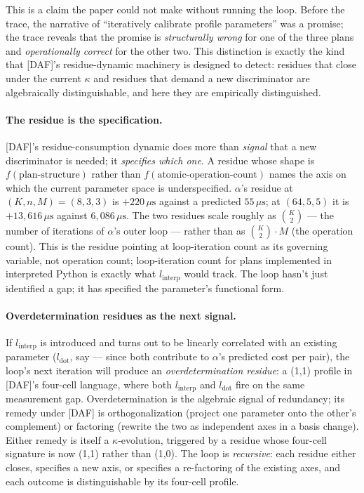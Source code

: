 This is a claim the paper could not make without
running the loop. Before the trace, the narrative of
``iteratively calibrate profile parameters'' was a
promise; the trace reveals that the promise is
\emph{structurally wrong} for one of the three plans
and \emph{operationally correct} for the other two. This
distinction is exactly the kind that [DAF]'s residue-dynamic
machinery is designed to detect: residues that close
under the current $\kappa$ and residues that demand a
new discriminator are algebraically distinguishable,
and here they are empirically distinguished.

\paragraph{The residue is the specification.}
[DAF]'s residue-consumption dynamic does more than
\emph{signal} that a new discriminator is needed; it
\emph{specifies which one}. A residue whose shape is
$f(\text{plan-structure})$ rather than
$f(\text{atomic-operation-count})$ names the axis on
which the current parameter space is underspecified.
$\alpha$'s residue at $(K, n, M) = (8,3,3)$ is
$+220\,\mu\mathrm{s}$ against a predicted
$55\,\mu\mathrm{s}$; at $(64,5,5)$ it is
$+13{,}616\,\mu\mathrm{s}$ against $6{,}086\,\mu\mathrm{s}$.
The two residues scale roughly as $\binom{K}{2}$
--- the number of iterations of $\alpha$'s outer loop ---
rather than as $\binom{K}{2} \cdot M$ (the operation count).
This is the residue pointing at loop-iteration count as its
governing variable, not operation count; loop-iteration
count for plans implemented in interpreted Python is
exactly what $l_{\mathrm{interp}}$ would track. The
loop hasn't just identified a gap; it has
specified the parameter's functional form.

\paragraph{Overdetermination residues as the next signal.}
If $l_{\mathrm{interp}}$ is introduced and turns out
to be linearly correlated with an existing parameter
($l_{\mathrm{dot}}$, say --- since both contribute to
$\alpha$'s predicted cost per pair), the loop's next
iteration will produce an \emph{overdetermination
residue}: a (1,1) profile in [DAF]'s four-cell
language, where both $l_{\mathrm{interp}}$ and
$l_{\mathrm{dot}}$ fire on the same measurement gap.
Overdetermination is the algebraic signal of
redundancy; its remedy under [DAF] is
orthogonalization (project one parameter onto the
other's complement) or factoring (rewrite the two
as independent axes in a basis change). Either
remedy is itself a $\kappa$-evolution, triggered by
a residue whose four-cell signature is now
(1,1) rather than (1,0). The loop is \emph{recursive}:
each residue either closes, specifies a new axis, or
specifies a re-factoring of the existing axes, and
each outcome is distinguishable by its four-cell
profile.

